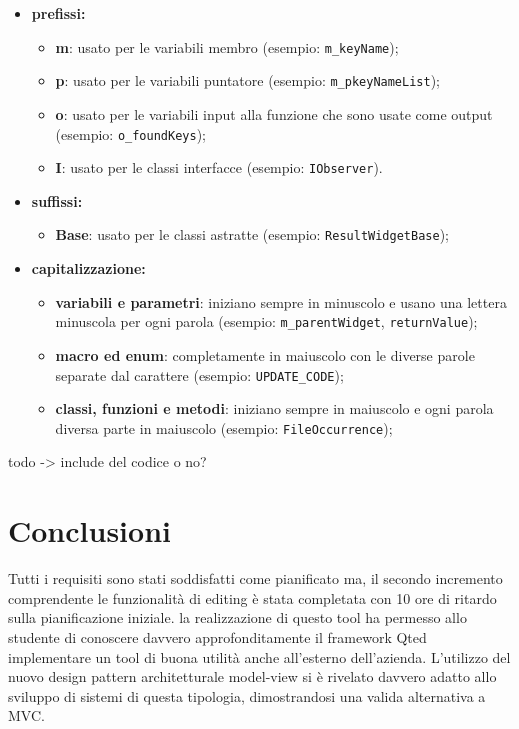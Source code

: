 \begin{itemize}
	\item \textbf{prefissi:}
	\begin{itemize}
		\item \textbf{m}: usato per le variabili membro (esempio: \texttt{m\_keyName});
		\item \textbf{p}: usato per le variabili puntatore (esempio: \texttt{m\_pkeyNameList});
		\item \textbf{o}: usato per le variabili input alla funzione che sono usate come output (esempio: \texttt{o\_foundKeys});
		\item \textbf{I}: usato per le classi interfacce (esempio: \texttt{IObserver}).
	\end{itemize}
	\item \textbf{suffissi:}
	\begin{itemize}
		\item \textbf{Base}: usato per le classi astratte (esempio: \texttt{ResultWidgetBase});
	\end{itemize}
	\item \textbf{capitalizzazione:}
	\begin{itemize}
		\item \textbf{variabili e parametri}: iniziano sempre in minuscolo e usano una lettera minuscola per ogni parola (esempio: \texttt{m\_parentWidget}, \texttt{returnValue});
		\item \textbf{macro ed enum}: completamente in maiuscolo con le diverse parole separate dal carattere \sq{\_} (esempio: \texttt{UPDATE\_CODE});
		\item \textbf{classi, funzioni e metodi}: iniziano sempre in maiuscolo e ogni parola diversa parte in maiuscolo (esempio: \texttt{FileOccurrence});
	\end{itemize}
\end{itemize}

todo -> include del codice o no?

\section{Conclusioni}
Tutti i requisiti sono stati soddisfatti come pianificato ma, il secondo incremento comprendente le funzionalità di editing è stata completata con 10 ore di ritardo sulla pianificazione iniziale. 
la realizzazione di questo tool ha permesso allo studente di conoscere davvero approfonditamente il framework Qt\textregistered ed implementare un tool di buona utilità anche all'esterno dell'azienda. L'utilizzo del nuovo design pattern architetturale model-view si è rivelato davvero adatto allo sviluppo di sistemi di questa tipologia, dimostrandosi una valida alternativa a MVC.
